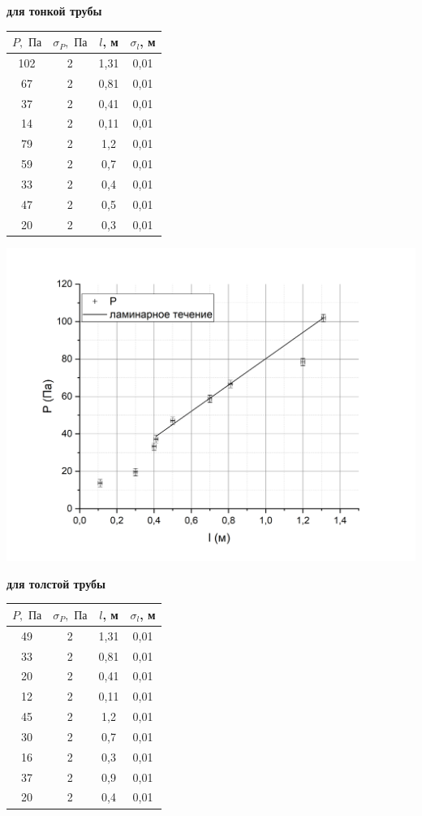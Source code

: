 \documentclass[a4paper, 12pt]{article}%
\begin{document}
\begin{enumerate}
\textbf{для тонкой трубы}

\begin{tabular}{|c|c|c|c|}
\hline
$P, \text{ Па}$ & $\sigma_P, \text{ Па}$ & $l$, м & $\sigma_l$, м \\ \hline
102 & 2 & 1,31 & 0,01 \\ \hline
67 & 2 & 0,81 & 0,01 \\ \hline
37 & 2 & 0,41 & 0,01 \\ \hline
14 & 2 & 0,11 & 0,01 \\ \hline
79 & 2 & 1,2 & 0,01 \\ \hline
59 & 2 & 0,7 & 0,01 \\ \hline
33 & 2 & 0,4 & 0,01 \\ \hline
47 & 2 & 0,5 & 0,01 \\ \hline
20 & 2 & 0,3 & 0,01 \\ \hline
\end{tabular}

\includegraphics[width = \textwidth]{133_3.jpg}

\newpage
\textbf{для толстой трубы}

\begin{tabular}{|c|c|c|c|}
\hline
$P, \text{ Па}$ & $\sigma_P, \text{ Па}$ & $l$, м & $\sigma_l$, м \\ \hline
49 & 2 & 1,31 & 0,01 \\ \hline
33 & 2 & 0,81 & 0,01 \\ \hline
20 & 2 & 0,41 & 0,01 \\ \hline
12 & 2 & 0,11 & 0,01 \\ \hline
45 & 2 & 1,2 & 0,01 \\ \hline
30 & 2 & 0,7 & 0,01 \\ \hline
16 & 2 & 0,3 & 0,01 \\ \hline
37 & 2 & 0,9 & 0,01 \\ \hline
20 & 2 & 0,4 & 0,01 \\ \hline
\end{tabular}


\end{enumerate}
\end{document}
